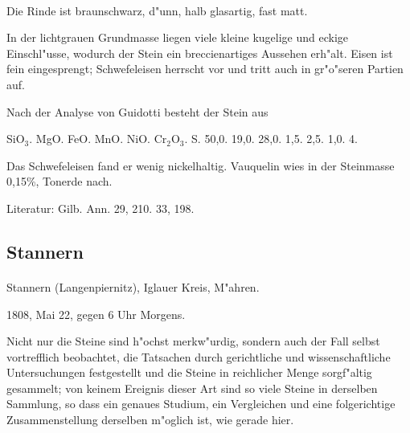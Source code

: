 \documentclass[a4paper, 11pt, oneside]{article}
\begin{document}
\paragraph{}
Die Rinde ist braunschwarz, d"unn, halb glasartig, fast matt.

In der lichtgrauen Grundmasse liegen viele kleine kugelige und eckige Einschl"usse, wodurch der Stein ein breccienartiges Aussehen erh"alt. Eisen ist fein eingesprengt; Schwefeleisen herrscht vor und tritt auch in gr"o"seren Partien auf.

Nach der Analyse von Guidotti besteht der Stein aus

SiO$_{3}$. MgO. FeO. MnO. NiO. Cr$_{2}$O$_{3}$. S.  
50,0. 19,0. 28,0. 1,5. 2,5. 1,0. 4.

Das Schwefeleisen fand er wenig nickelhaltig. Vauquelin wies in der Steinmasse 0,15\%, Tonerde nach.

Literatur: Gilb. Ann. 29, 210. 33, 198.

\subsection{Stannern}
\normalsize
\paragraph{}
Stannern (Langenpiernitz), Iglauer Kreis, M"ahren.

1808, Mai 22, gegen 6 Uhr Morgens.

Nicht nur die Steine sind h"ochst merkw"urdig, sondern auch der Fall selbst vortrefflich beobachtet, die Tatsachen durch gerichtliche und wissenschaftliche Untersuchungen festgestellt und die Steine in reichlicher Menge sorgf"altig gesammelt; von keinem Ereignis dieser Art sind so viele Steine in derselben Sammlung, so dass ein genaues Studium, ein Vergleichen und eine folgerichtige Zusammenstellung derselben m"oglich ist, wie gerade hier.
\end{document}

